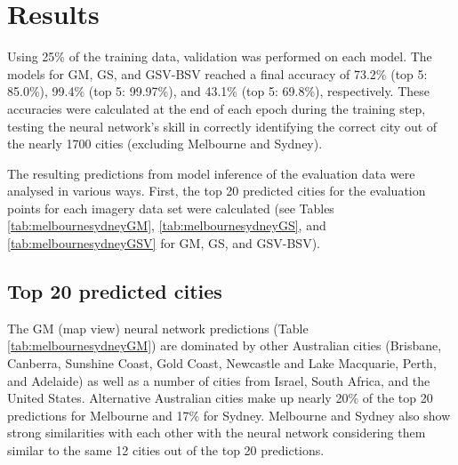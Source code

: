 \documentclass[Crown,sageh,times]{sagej}
\begin{document}
\section{Results}\label{sec:results}

Using 25\% of the training data, validation was performed on each model. The models for GM, GS, and GSV-BSV reached a final accuracy of 73.2\% (top 5: 85.0\%), 99.4\% (top 5: 99.97\%), and 43.1\% (top 5: 69.8\%), respectively. These accuracies were calculated at the end of each epoch during the training step, testing the neural network's skill in correctly identifying the correct city out of the nearly 1700 cities (excluding Melbourne and Sydney).


The resulting predictions from model inference of the evaluation data were analysed in various ways. First, the top 20 predicted cities for the evaluation points for each imagery data set were calculated (see Tables \ref{tab:melbournesydneyGM}, \ref{tab:melbournesydneyGS}, and \ref{tab:melbournesydneyGSV} for GM, GS, and GSV-BSV).

\subsection{Top 20 predicted cities} 

The GM (map view) neural network predictions (Table \ref{tab:melbournesydneyGM}) are dominated by other Australian cities (Brisbane, Canberra, Sunshine Coast, Gold Coast, Newcastle and Lake Macquarie, Perth, and Adelaide) as well as a number of cities from Israel, South Africa, and the United States. Alternative Australian cities make up nearly 20\% of the top 20 predictions for Melbourne and 17\% for Sydney. Melbourne and Sydney also show strong similarities with each other with the neural network considering them similar to the same 12 cities out of the top 20 predictions.
\end{document}
